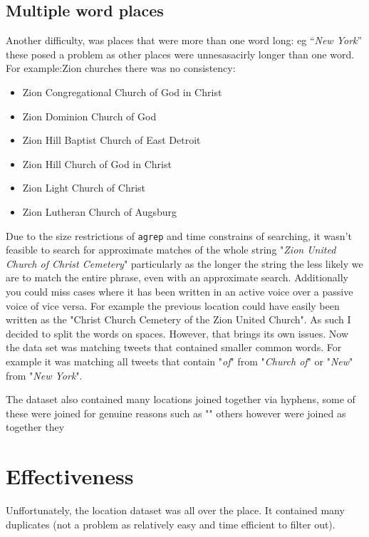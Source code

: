 \documentclass[a4paper]{article}
\begin{document}
\subsection{Multiple word places}
Another difficulty, was places that were more than one word long: eg “\textit{New York}” these posed a problem as other places were unnesasacirly longer than one word. For example:Zion churches there was no consistency:
\begin{itemize}
\item Zion Congregational Church of God in Christ
\item Zion Dominion Church of God
\item Zion Hill Baptist Church of East Detroit
\item Zion Hill Church of God in Christ
\item Zion Light Church of Christ
\item Zion Lutheran Church of Augsburg
\end{itemize}

Due to the size restrictions of \texttt{agrep} and time constrains of searching, it wasn't feasible to search for approximate matches of the whole string "\textit{Zion United Church of Christ Cemetery}" particularly as the longer the string the less likely we are to match the entire phrase, even with an approximate search. Additionally you could miss cases where it has been written in an active voice over a passive voice of vice versa. For example the previous location could have easily been written as the "Christ Church Cemetery of the Zion United Church". As such I decided to split the words on spaces. However, that brings its own issues. Now the data set was matching tweets that contained smaller common words. For example it was matching all tweets that contain  "\textit{of}" from "\textit{Church of}" or "\textit{New}" from "\textit{New York}".

The dataset also contained many locations joined together via hyphens, some of these were joined for genuine reasons such as "" others however were joined as together they

\section{Effectiveness}
Unffortunately, the location dataset was all over the place. It contained many duplicates (not a problem as relatively easy and time efficient to filter out).
\end{document}
